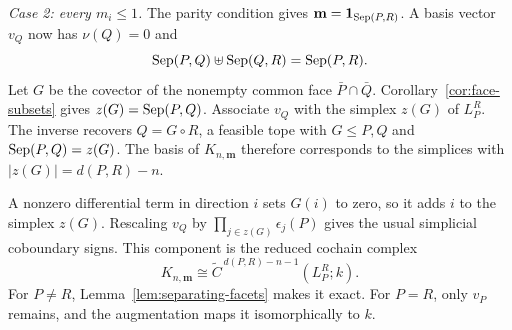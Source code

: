 \smallskip
\noindent\emph{Case 2: every $m_i\leq1$.}
The parity condition gives
$\mathbf m=\mathbf 1_{\operatorname{Sep}(P,R)}$.
A basis vector $v_Q$ now has $\nu(Q)=0$ and
\[
 \operatorname{Sep}(P,Q)\uplus\operatorname{Sep}(Q,R)=\operatorname{Sep}(P,R).
\]
Let $G$ be the covector of the nonempty
common face $\bar P\cap\bar Q$. Corollary~\ref{cor:face-subsets}
gives $z(G)=\operatorname{Sep}(P,Q)$.
Associate $v_Q$ with the simplex $z(G)$ of $L_P^R$.
The inverse recovers $Q=G\circ R$, a feasible tope with
$G\leq P,Q$ and $\operatorname{Sep}(P,Q)=z(G)$.
The basis of $K_{n,\mathbf m}$ therefore corresponds to the simplices
with $|z(G)|=d(P,R)-n$.

A nonzero differential term in direction $i$ sets $G(i)$ to zero,
so it adds $i$ to the simplex $z(G)$.
Rescaling $v_Q$ by $\prod_{j\in z(G)}\epsilon_j(P)$
gives the usual simplicial coboundary signs. This component is the reduced
cochain complex
\[
 K_{n,\mathbf m}
 \cong\widetilde C^{\,d(P,R)-n-1}(L_P^R;k).
\]
For $P\ne R$, Lemma~\ref{lem:separating-facets} makes it exact.
For $P=R$, only $v_P$ remains, and the augmentation
maps it isomorphically to $k$.
